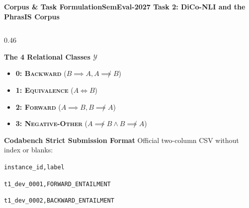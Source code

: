 \documentclass[aspectratio=169,10pt]{beamer}
\begin{document}
\begin{frame}{\textbf{Corpus \& Task Formulation}}{\textbf{SemEval-2027 Task 2: DiCo-NLI and the PhrasIS Corpus}}
\begin{columns}[T]
    \begin{column}{0.46\textwidth}
      \begin{block}{\textbf{The 4 Relational Classes $\mathcal{Y}$}}
        \footnotesize
        \begin{itemize}\setlength{\itemsep}{1pt}\setlength{\parskip}{0pt}
          \item \textbf{0: \textsc{Backward}} ($B \implies A, A \not\implies B$)
          \item \textbf{1: \textsc{Equivalence}} ($A \iff B$)
          \item \textbf{2: \textsc{Forward}} ($A \implies B, B \not\implies A$)
          \item \textbf{3: \textsc{Negative-Other}} ($A \not\implies B \land B \not\implies A$)
        \end{itemize}
      \end{block}
      \vspace{0.05cm}
      \begin{exampleblock}{\textbf{Codabench Strict Submission Format}}
        \footnotesize
        Official two-column CSV without index or blanks:
        \vskip 2pt
        {\centering\scriptsize
          \texttt{instance\_id,label}\par
          \texttt{t1\_dev\_0001,FORWARD\_ENTAILMENT}\par
          \texttt{t1\_dev\_0002,BACKWARD\_ENTAILMENT}\par}
      \end{exampleblock}
    \end{column}
  \end{columns}
\end{frame}
\end{document}
